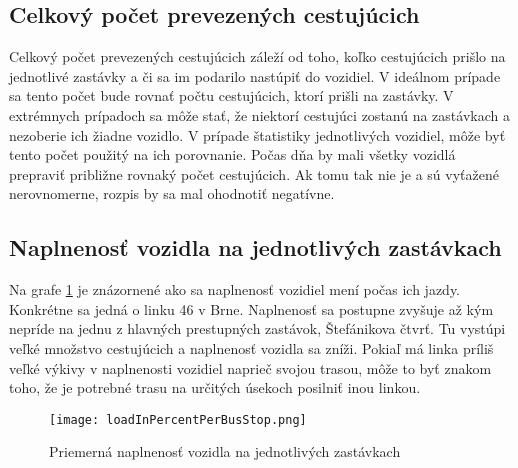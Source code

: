 \subsection*{Celkový počet prevezených cestujúcich}
Celkový počet prevezených cestujúcich záleží od toho, koľko cestujúcich prišlo na jednotlivé zastávky a či sa im podarilo nastúpiť do vozidiel.
V ideálnom prípade sa tento počet bude rovnať počtu cestujúcich, ktorí prišli na zastávky.
V extrémnych prípadoch sa môže stať, že niektorí cestujúci zostanú na zastávkach a nezoberie ich žiadne vozidlo.
V prípade štatistiky jednotlivých vozidiel, môže byť tento počet použitý na ich porovnanie.
Počas dňa by mali všetky vozidlá prepraviť približne rovnaký počet cestujúcich.
Ak tomu tak nie je a sú vyťažené nerovnomerne, rozpis by sa mal ohodnotiť negatívne.

\subsection*{Naplnenosť vozidla na jednotlivých zastávkach}
Na grafe \ref{fig:averageLoad} je znázornené ako sa naplnenosť vozidiel mení počas ich jazdy.
Konkrétne sa jedná o linku 46 v Brne.
Naplnenosť sa postupne zvyšuje až kým nepríde na jednu z hlavných prestupných zastávok, Štefánikova čtvrť.
Tu vystúpi veľké množstvo cestujúcich a naplnenosť vozidla sa zníži.
Pokiaľ má linka príliš veľké výkivy v naplnenosti vozidiel naprieč svojou trasou, môže to byť znakom toho, že je potrebné trasu na určitých úsekoch posilniť inou linkou.
\begin{figure}[h]
  \label{fig:averageLoad}
  \centering
  \texttt{[image: loadInPercentPerBusStop.png]}
  \caption{Priemerná naplnenosť vozidla na jednotlivých zastávkach}
\end{figure}





































